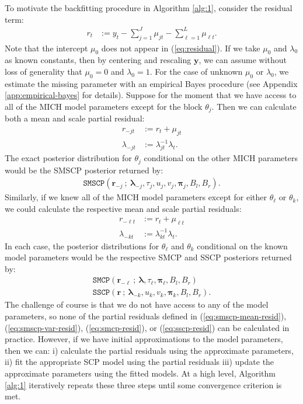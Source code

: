 To motivate the backfitting procedure in Algorithm \ref{alg:1}, consider the residual term:
\begin{align}\label{eq:residual}
    r_t &:= y_t - \sum_{j = 1}^J \mu_{jt}  - \sum_{\ell = 1}^L \mu_{\ell t}.
\end{align}
Note that the intercept $\mu_0$ does not appear in (\ref{eq:residual}). If we take $\mu_0$ and $\lambda_0$ as known constants, then by centering and rescaling $\mathbf{y}$, we can assume without loss of generality that $\mu_0 = 0$ and $\lambda_0=1$. For the case of unknown $\mu_0$ or $\lambda_0$, we estimate the missing parameter with an empirical Bayes procedure (see Appendix \ref{app:empirical-bayes} for details). Suppose for the moment that we have access to all of the MICH model parameters except for the block $\theta_j$. Then we can calculate both a mean and scale partial residual:
\begin{align}
    r_{-jt} &:= r_t + \mu_{jt \label{eq:smscp-mean-resid}} \\
    \lambda_{-jt} &:= \lambda_{jt}^{-1}\lambda_t. \label{eq:smscp-var-resid}
\end{align}
The exact posterior distribution for $\theta_j$ conditional on the other MICH parameters would be the SMSCP posterior returned by:
\begin{align}
    \texttt{SMSCP}(\mathbf{r}_{-j}\:;\: \boldsymbol{\lambda}_{-j}, \tau_j, u_j, v_j, \boldsymbol{\pi}_j, B_l,B_r).
\end{align}
Similarly, if we knew all of the MICH model parameters except for either $\theta_\ell$ or $\theta_k$, we could calculate the respective mean and scale partial residuals: 
\begin{align}
    r_{-\ell t} &:= r_t + \mu_{\ell t} \label{eq:smcp-resid}\\
    \lambda_{-kt} &:= \lambda_{kt}^{-1}\lambda_t. \label{eq:sscp-resid}
\end{align}
In each case, the posterior distributions for $\theta_\ell$ and $\theta_k$ conditional on the known model parameters would be the respective SMCP and SSCP posteriors returned by:
\begin{gather}
    \texttt{SMCP}(\mathbf{r}_{-\ell}\:;\: \boldsymbol{\lambda}, \tau_\ell,\boldsymbol{\pi}_\ell, B_l,B_r) \label{eq:smcp-call} \\
    \texttt{SSCP}(\mathbf{r}\:;\: \boldsymbol{\lambda}_{-k}, u_k,v_k,\boldsymbol{\pi}_k, B_l,B_r). \label{eq:sscp-call}
\end{gather}
The challenge of course is that we do not have access to any of the model parameters, so none of the partial residuals defined in (\ref{eq:smscp-mean-resid}), (\ref{eq:smscp-var-resid}), (\ref{eq:smcp-resid}), or (\ref{eq:sscp-resid}) can be calculated in practice. However, if we have initial approximations to the model parameters, then we can: i) calculate the partial residuals using the approximate parameters, ii) fit the appropriate SCP model using the partial residuals iii) update the approximate parameters using the fitted models. At a high level, Algorithm \ref{alg:1} iteratively repeats these three steps until some convergence criterion is met.

